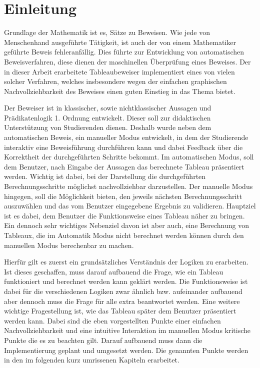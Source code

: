 
\chapter{Einleitung}
Grundlage der Mathematik ist es, Sätze zu Beweisen. Wie jede von Menschenhand ausgeführte Tätigkeit, ist auch der von einem Mathematiker geführte Beweis fehleranfällig. Dies führte zur Entwicklung von automatischen Beweisverfahren, diese dienen der maschinellen Überprüfung eines Beweises. Der in dieser Arbeit erarbeitete Tableaubeweiser implementiert eines von vielen solcher Verfahren, welches insbesondere wegen der einfachen graphischen Nachvollziehbarkeit des Beweises einen guten Einstieg in das Thema bietet.

Der Beweiser ist in klassischer, sowie nichtklassischer Aussagen und Prädikatenlogik 1. Ordnung entwickelt. Dieser soll zur didaktischen Unterstützung von Studierenden dienen. Deshalb wurde neben dem automatischen Beweis, ein manueller Modus entwickelt, in dem der Studierende interaktiv eine Beweisführung durchführen kann und dabei Feedback über die Korrektheit der durchgeführten Schritte bekommt. Im automatischen Modus, soll dem Benutzer, nach Eingabe der Aussagen das berechnete Tableau präsentiert werden. Wichtig ist dabei, bei der Darstellung die durchgeführten Berechnungsschritte möglichst nachvollziehbar darzustellen. Der manuelle Modus hingegen, soll die Möglichkeit bieten, den jeweils nächsten Berechnungsschritt auszuwählen und das vom Benutzer eingegebene Ergebnis zu validieren. Hauptziel ist es dabei, dem Benutzer die Funktionsweise eines Tableau näher zu bringen. Ein dennoch sehr wichtiges Nebenziel davon ist aber auch, eine Berechnung von Tableaux, die im Automatik Modus nicht berechnet werden können durch den manuellen Modus berechenbar zu machen.

Hierfür gilt es zuerst ein grundsätzliches Verständnis der Logiken zu erarbeiten. Ist dieses geschaffen, muss darauf aufbauend die Frage, wie ein Tableau funktioniert und berechnet werden kann geklärt werden. Die Funktionsweise ist dabei für die verschiedenen Logiken zwar ähnlich bzw. aufeinander aufbauend aber dennoch muss die Frage für alle extra beantwortet werden. Eine weitere wichtige Fragestellung ist, wie das Tableau später dem Benutzer präsentiert werden kann. Dabei sind die eben vorgestellten Punkte einer einfachen Nachvollziehbarkeit und eine intuitive Interaktion im manuellen Modus kritische Punkte die es zu beachten gilt. Darauf aufbauend muss dann die Implementierung geplant und umgesetzt werden. Die genannten Punkte werden in den im folgenden kurz umrissenen Kapiteln erarbeitet.

